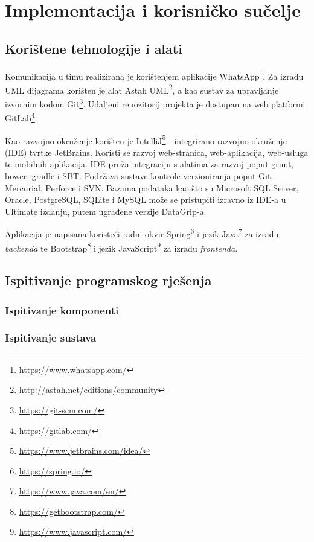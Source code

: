 \chapter{Implementacija i korisničko sučelje}
		
		
		\section{Korištene tehnologije i alati}
			
		Komunikacija u timu realizirana je korištenjem aplikacije WhatsApp\footnote{\url{https://www.whatsapp.com/}}. Za izradu UML dijagrama korišten je alat Astah UML\footnote{\url{http://astah.net/editions/community}}, a kao sustav za upravljanje izvornim kodom Git\footnote{\url{https://git-scm.com/}}. Udaljeni repozitorij projekta je dostupan na web platformi GitLab\footnote{\url{https://gitlab.com/}}.
			
				Kao razvojno okruženje korišten je IntelliJ\footnote{\url{https://www.jetbrains.com/idea/}} - integrirano razvojno okruženje (IDE) tvrtke JetBrains. Koristi se razvoj web-stranica, web-aplikacija, web-usluga te mobilnih aplikacija. IDE pruža integraciju s alatima za razvoj poput grunt, bower, gradle i SBT. Podržava sustave kontrole verzioniranja poput Git, Mercurial, Perforce i SVN. Bazama podataka kao što su Microsoft SQL Server, Oracle, PostgreSQL, SQLite i MySQL može se pristupiti izravno iz IDE-a u Ultimate izdanju, putem ugrađene verzije DataGrip-a.
				
				Aplikacija je napisana koristeći radni okvir Spring\footnote{\url{https://spring.io/}} i jezik Java\footnote{\url{https://www.java.com/en/}} za izradu \textit{backenda} te Bootstrap\footnote{\url{https://getbootstrap.com/}} i jezik JavaScript\footnote{\url{https://www.javascript.com/}} za izradu \textit{frontenda}.
 			
			\eject 
		
	
		\section{Ispitivanje programskog rješenja}
			
			\subsection{Ispitivanje komponenti}
		
			
			\subsection{Ispitivanje sustava}
			
